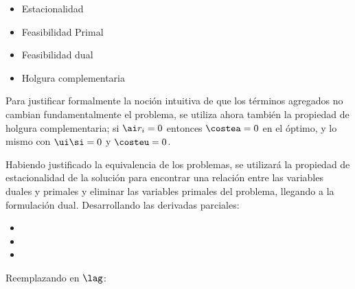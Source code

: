 \begin{itemize}

\item Estacionalidad\\

\item Feasibilidad Primal	\\
\ma{
\riz & \quad \siz
}

\item Feasibilidad dual\\
\ma{
\aiz & \quad \uiz
}

\item Holgura complementaria\\

\end{itemize}

Para justificar formalmente la noción intuitiva de que los términos agregados no cambian fundamentalmente el problema, se utiliza ahora también la propiedad de holgura complementaria; si $\ai r_i=0$ entonces $\costea =0$ en el óptimo, y lo mismo con $\ui \si = 0$ y $\costeu =0$.

Habiendo justificado la equivalencia de los problemas, se utilizará la propiedad de estacionalidad de la solución para encontrar una relación entre las variables duales y primales y eliminar las variables primales del problema, llegando a la formulación dual. Desarrollando las derivadas parciales:

\begin{itemize}
\item \ma{
\derivative{\lag}{\wv} &= \derivative{\, \costew}{\wv} - \derivative{\, \costea}{\wv}  = \wv - \sumayx = 0    \nonumber \\ \tn \wv &=  \sumayx
}
\item {}

\item {} 

\end{itemize}


Reemplazando en $\lag$:

\ma{
\lag = \costew + \costes - \costea - \costeu
}

